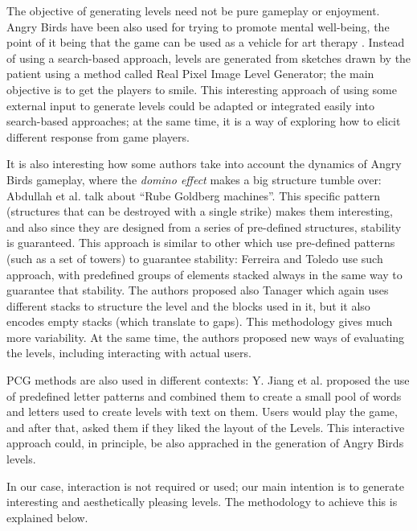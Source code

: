 \documentclass[conference]{IEEEtran}
\begin{document}
The objective of generating levels need not be pure gameplay or enjoyment. Angry Birds have been also used for trying to promote mental well-being, the point of it being that the game can be used as a vehicle for art therapy \cite{fang2019angrybirdslike}. Instead of using a search-based approach, levels are generated from sketches drawn by the patient using a method called Real Pixel Image Level Generator; the main objective is to get the players to smile. This interesting approach of using some external input to generate levels could be adapted or integrated easily into search-based approaches; at the same time, it is a way of exploring how to elicit different response from game players.

It is also interesting how some authors take into account the dynamics of Angry Birds gameplay, where the {\em domino effect} makes a big structure tumble over: Abdullah et al. \cite{Abdullah2019} talk about ``Rube Goldberg machines''. This specific pattern (structures that can be destroyed with a single strike) makes them interesting, and also since they are designed from a series of pre-defined structures, stability is guaranteed. This approach is similar to other which use pre-defined patterns (such as a set of towers) to guarantee stability: Ferreira and Toledo \cite{ferreira2014search} use such approach, with predefined groups of elements stacked always in the same way to guarantee that stability. The authors proposed also Tanager \cite{8082517} which again uses different stacks to structure the level and the blocks used in it, but it also encodes empty stacks (which translate to gaps). This methodology gives much more variability. At the same time, the authors proposed new ways of evaluating the levels, including interacting with actual users. 

PCG methods are also used in different contexts: Y. Jiang et al. \cite{Jiang2017}
proposed the use of predefined letter patterns and combined them to create a
small pool of words and letters used to create levels with text on them.
Users would play the game, and after that,   asked them if they liked the
layout of the Levels. This interactive approach could, in principle, be also apprached in the generation of Angry Birds levels.

In our case, interaction is not required or used; our main intention is to generate interesting and aesthetically pleasing levels. The methodology to achieve this is explained below.

\end{document}

